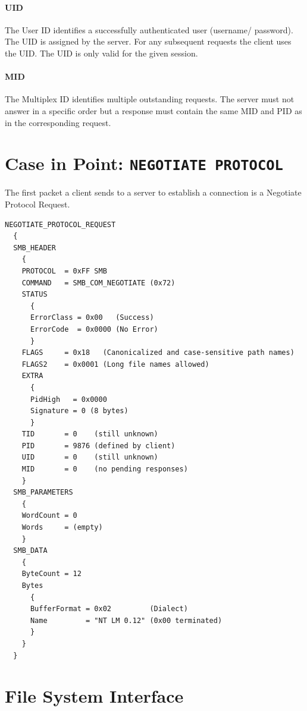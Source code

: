 \documentclass[11pt,a4paper]{book}
\begin{document}
\paragraph{UID} The User ID identifies a successfully authenticated user (username/ password). The UID is assigned by the server. For any subsequent requests the client uses the UID. The UID is only valid for the given session.

\paragraph{MID} The Multiplex ID identifies multiple outstanding requests. The server must not answer in a specific order but a response must contain the same MID and PID as in the corresponding request.

\section{Case in Point: \texttt{NEGOTIATE PROTOCOL}}
The first packet a client sends to a server to establish a connection is a Negotiate Protocol Request.
\begin{verbatim}
NEGOTIATE_PROTOCOL_REQUEST
  {
  SMB_HEADER
    {
    PROTOCOL  = 0xFF SMB
    COMMAND   = SMB_COM_NEGOTIATE (0x72)
    STATUS
      {
      ErrorClass = 0x00   (Success)
      ErrorCode  = 0x0000 (No Error)
      }
    FLAGS     = 0x18   (Canonicalized and case-sensitive path names)
    FLAGS2    = 0x0001 (Long file names allowed)
    EXTRA
      {
      PidHigh   = 0x0000
      Signature = 0 (8 bytes)
      }
    TID       = 0    (still unknown)
    PID       = 9876 (defined by client)
    UID       = 0    (still unknown)
    MID       = 0    (no pending responses)
    }
  SMB_PARAMETERS
    {
    WordCount = 0
    Words     = (empty)
    }
  SMB_DATA
    {
    ByteCount = 12
    Bytes
      {
      BufferFormat = 0x02         (Dialect)
      Name         = "NT LM 0.12" (0x00 terminated)
      }
    }
  }
\end{verbatim}

\section{File System Interface}
\end{document}
